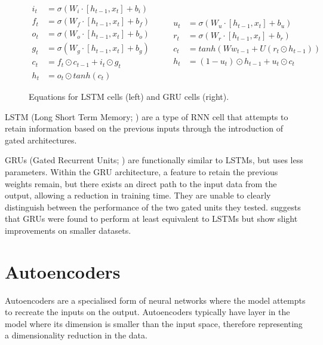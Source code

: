 \documentclass[12pt,twoside]{report}
\begin{document}
\begin{figure}[!ht]
\begin{equation}
  \begin{split}
    i_t &= \sigma(W_i \cdot [h_{t-1},x_t] + b_i) \\
    f_t &= \sigma(W_f \cdot [h_{t-1},x_t] + b_f) \\
		o_t &= \sigma(W_o \cdot [h_{t-1},x_t] + b_o) \\
		g_t &= \sigma(W_g \cdot [h_{t-1},x_t] + b_g) \\
		c_t &= f_t \odot c_{t-1} + i_t \odot g_t \\
		h_t &= o_t \odot tanh(c_t) 
  \end{split}
	\quad\quad
  \begin{split}
		u_t &= \sigma(W_u \cdot [h_{t-1},x_t] + b_u) \\
		r_t &= \sigma(W_r \cdot [h_{t-1},x_t] + b_r) \\
		c_t &= tanh(Ww_{t-1}+U(r_t \odot h_{t-1})) \\
		h_t &= (1-u_{t})\odot h_{t-1} + u_t \odot c_t
  \end{split}
\end{equation}
\caption{Equations for LSTM cells (left) and GRU cells (right).}
\end{figure}
 
LSTM (Long Short Term Memory; \cite{hochreiter_long_1997}) are a type of RNN cell that attempts to retain information based on the previous inputs through the introduction of gated architectures. 

GRUs (Gated Recurrent Units; \cite{cho_properties_2014}) are functionally similar to LSTMs, but uses less parameters. Within the GRU architecture, a feature to retain the previous weights remain, but there exists an direct path to the input data from the output, allowing a reduction in training time. They are unable to clearly distinguish between the performance of the two gated units they tested. \cite{chung_empirical_2014} suggests that GRUs were found to perform at least equivalent to LSTMs but show slight improvements on smaller datasets. 

\section{Autoencoders}

Autoencoders are a specialised form of neural networks where the model attempts to recreate the inputs on the output. Autoencoders typically have  layer in the model where its dimension is smaller than the input space, therefore representing a dimensionality reduction in the data. 
\end{document}
